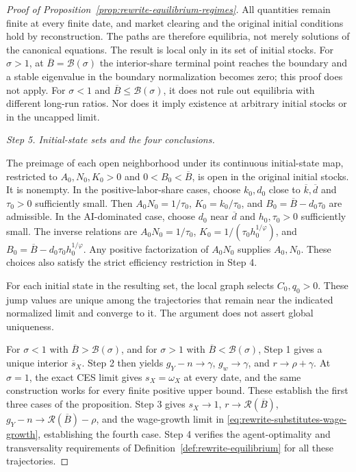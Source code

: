 \begin{proof}[Proof of Proposition~\ref{prop:rewrite-equilibrium-regimes}]
All quantities remain finite at every finite date, and market clearing and
the original initial conditions hold by reconstruction. The paths are
therefore equilibria, not merely solutions of the
canonical equations. The result is local only in its set of initial
stocks. For $\sigma>1$, at $\overline B=\mathcal B(\sigma)$ the interior-share terminal
point reaches the boundary and a stable eigenvalue in the boundary
normalization becomes zero; this proof does not apply. For
$\sigma<1$ and $\overline B\leq\mathcal B(\sigma)$, it does not rule out
equilibria with different long-run ratios. Nor does it imply existence at
arbitrary initial stocks or in the uncapped limit.

\par\medskip\noindent\textit{Step 5. Initial-state sets and the four conclusions.}

The preimage of each open neighborhood under its continuous
initial-state map, restricted to $A_0,N_0,K_0>0$ and
$0<B_0<\overline B$, is open in the original initial stocks.
It is nonempty. In the positive-labor-share cases, choose
$k_0,d_0$ close to $\overline k,\overline d$ and $\tau_0>0$
sufficiently small. Then $A_0N_0=1/\tau_0$,
$K_0=k_0/\tau_0$, and $B_0=\overline B-d_0\tau_0$ are admissible.
In the AI-dominated case, choose $d_0$ near $\overline d$ and
$h_0,\tau_0>0$ sufficiently small. The inverse relations are
$A_0N_0=1/\tau_0$, $K_0=1/(\tau_0h_0^{1/\varphi})$, and
$B_0=\overline B-d_0\tau_0h_0^{1/\varphi}$.
Any positive factorization of $A_0N_0$ supplies $A_0,N_0$.
These choices also satisfy the strict efficiency restriction in Step 4.

For each initial state in the resulting set, the local graph selects
$C_0,q_0>0$. These jump values are unique among the trajectories
that remain near the indicated normalized limit and converge to it.
The argument does not assert global uniqueness.

For $\sigma<1$ with $\overline B>\mathcal B(\sigma)$, and for
$\sigma>1$ with $\overline B<\mathcal B(\sigma)$, Step 1 gives a unique
interior $\overline s_X$. Step 2 then yields
$g_Y-n\to\gamma$, $g_w\to\gamma$, and $r\to\rho+\gamma$.
At $\sigma=1$, the exact CES limit gives $s_X=\omega_X$ at every date,
and the same construction works for every finite positive upper bound.
These establish the first three cases of the proposition.
Step 3 gives $s_X\to1$, $r\to\mathcal R(\overline B)$,
$g_Y-n\to\mathcal R(\overline B)-\rho$, and the wage-growth limit in
\eqref{eq:rewrite-substitutes-wage-growth}, establishing the fourth case.
Step 4 verifies the agent-optimality and transversality requirements of
Definition~\ref{def:rewrite-equilibrium} for all these trajectories.
\end{proof}

